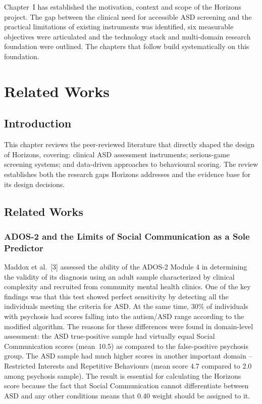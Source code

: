 \documentclass[12pt,a4paper,oneside]{report}
\begin{document}
	Chapter~I has established the motivation, context and scope of the Horizons project. The gap between the clinical need for accessible ASD screening and the practical limitations of existing instruments was identified, six measurable objectives were articulated and the technology stack and multi-domain research foundation were outlined. The chapters that follow build systematically on this foundation.
	
	\clearpage
	\chapter{Related Works}
	
	\section{Introduction}
	
	This chapter reviews the peer-reviewed literature that directly shaped the design of Horizons, covering: clinical ASD assessment instruments; serious-game screening systems; and data-driven approaches to behavioural scoring. The review establishes both the research gaps Horizons addresses and the evidence base for its design decisions.
	
	\section{Related Works}
	
	\subsection{ADOS-2 and the Limits of Social Communication as a Sole Predictor}
	
	Maddox et al.~[3] assessed the ability of the ADOS-2 Module 4 in determining the validity of its diagnosis using an adult sample characterized by clinical complexity and recruited from community mental health clinics. One of the key findings was that this test showed perfect sensitivity by detecting all the individuals meeting the criteria for ASD. At the same time, 30\% of individuals with psychosis had scores falling into the autism/ASD range according to the modified algorithm. The reasons for these differences were found in domain-level assessment: the ASD true-positive sample had virtually equal Social Communication scores (mean~10.5) as compared to the false-positive psychosis group. The ASD sample had much higher scores in another important domain – Restricted Interests and Repetitive Behaviours (mean score 4.7 compared to 2.0 among psychosis sample). The result is essential for calculating the Horizons score because the fact that Social Communication cannot differentiate between ASD and any other conditions means that 0.40 weight should be assigned to it.
	
\end{document}
